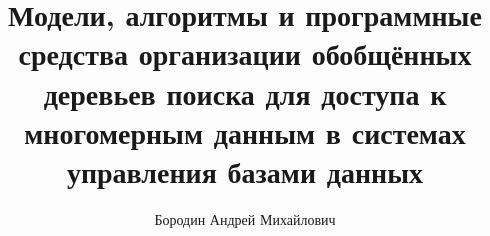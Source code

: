 \documentclass[14pt, a4paper]{extreport}
\title{Модели, алгоритмы и программные средства организации обобщённых деревьев
поиска для доступа к многомерным данным в системах управления базами данных}
\author{Бородин Андрей Михайлович}
\date{}
\begin{document}


\tableofcontents











\renewcommand{\bibname}{Список использованных источников}



\appendix


\end{document}

